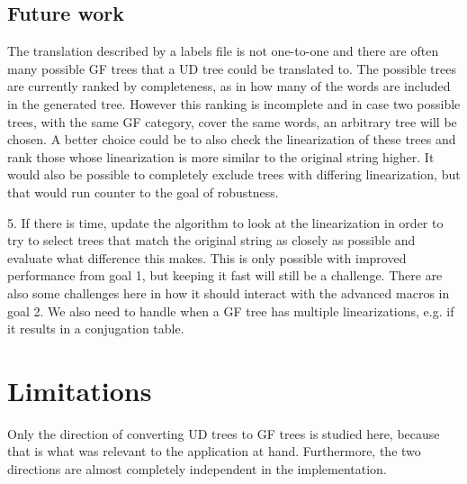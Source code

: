 \subsection{Future work}

The translation described by a labels file is not one-to-one and there are often many possible GF trees that a UD tree could be translated to. The possible trees are currently ranked by completeness, as in how many of the words are included in the generated tree. However this ranking is incomplete and in case two possible trees, with the same GF category, cover the same words, an arbitrary tree will be chosen. A better choice could be to also check the linearization of these trees and rank those whose linearization is more similar to the original string higher. It would also be possible to completely exclude trees with differing linearization, but that would run counter to the goal of robustness.


5. If there is time, update the algorithm to look at the linearization in order to try to select trees that match the original string as closely as possible and evaluate what difference this makes. This is only possible with improved performance from goal 1, but keeping it fast will still be a challenge. There are also some challenges here in how it should interact with the advanced macros in goal 2. We also need to handle when a GF tree has multiple linearizations, e.g. if it results in a conjugation table.





\section{Limitations}

Only the direction of converting UD trees to GF trees is studied here, because that is what was relevant to the application at hand. Furthermore, the two directions are almost completely independent in the implementation.



%


